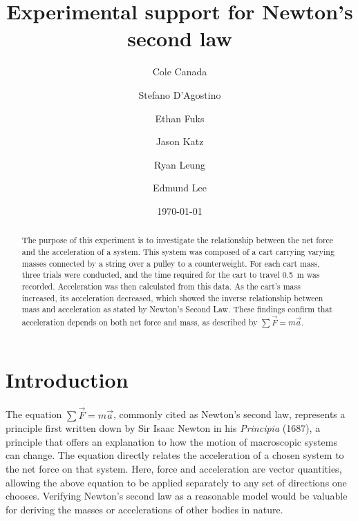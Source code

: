 \documentclass[reprint,amsmath,amssymb,aps,twoside]{revtex4-2}
\begin{document}
\setcounter{page}{11}
\title{Experimental support for Newton's second law}
\author{Cole Canada}
\author{Stefano D'Agostino}
\author{Ethan Fuks}
\author{Jason Katz}
\author{Ryan Leung}
\author{Edmund Lee}
\date{\today} 

\begin{abstract}
The purpose of this experiment is to investigate the relationship between the net force and the acceleration of a system. This system was composed of a cart carrying varying masses connected by a string over a pulley to a counterweight. For each cart mass, three trials were conducted, and the time required for the cart to travel \qty{0.5}{\meter} was recorded. Acceleration was then calculated from this data. As the cart’s mass increased, its acceleration decreased, which showed the inverse relationship between mass and acceleration as stated by Newton's Second Law. These findings confirm that acceleration depends on both net force and mass, as described by  $\sum\vec{F} = m\vec{a}$.
\end{abstract}


\maketitle\thispagestyle{mytitlepage}





\section{Introduction}\label{sec:introduction}
The equation $\sum\vec{F} = m\vec{a}$, commonly cited as Newton’s second law, represents a principle first written down by Sir Isaac Newton \cite{newton1687principia} in his \textit{Principia} (1687), a principle that offers an explanation to how the motion of macroscopic systems can change. The equation directly relates the acceleration of a chosen system to the net force on that system. Here, force and acceleration are vector quantities, allowing the above equation to be applied separately to any set of directions one chooses. Verifying Newton’s second law as a reasonable model would be valuable for deriving the masses or accelerations of other bodies in nature.
\end{document}

